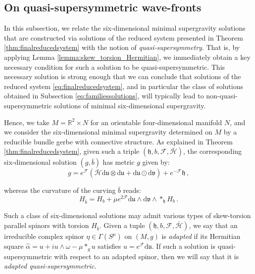 \documentclass[10pt,a4paper,twoside,reqno]{amsart}
\theoremstyle{plain}
\theoremstyle{definition}
\theoremstyle{remark}
\def\dd{\mathrm{d}}
\def\cH{\mathcal{H}}
\def\cF{\mathcal{F}}
\def\cH{\mathcal{H}}
\def\dd{\mathrm{d}}
\def\fru{\mathfrak{u}}
\def\frv{\mathfrak{v}}
\begin{document}
\subsection{On quasi-supersymmetric wave-fronts}


In this subsection, we relate the six-dimensional minimal supergravity solutions that are constructed via solutions of the reduced system presented in Theorem \ref{thm:finalreducedsystem} with the notion of \emph{quasi-supersymmetry}. That is, by applying Lemma \ref{lemma:skew_torsion_Hermitian}, we immediately obtain a key necessary condition for such a solution to be quasi-supersymmetric. This necessary solution is strong enough that we can conclude that solutions of the reduced system \eqref{eq:finalreducedsystem}, and in particular the class of solutions obtained in Subsection \ref{eq:familiessolutions}, will typically lead to non-quasi-supersymmetric solutions of minimal six-dimensional supergravity.\medskip

Hence, we take $M=\mathbb{R}^2 \times N$ for an orientable four-dimensional manifold $N$, and we consider the six-dimensional minimal supergravity determined on $M$ by a reducible bundle gerbe with connective structure. As explained in Theorem \ref{thm:finalreducedsystem}, given such a triple $(\mathfrak{h},b,\cF,\bar{\cH})$, the corresponding six-dimensional solution $(g,\bar{b})$ has metric $g$ given by:
\begin{equation*}
g = e^{\cF} (\bar{\cH} \dd\fru \otimes \dd \fru + \dd\fru\odot \dd\frv) + e^{-\cF}\mathfrak{h}\, ,
\end{equation*}

\noindent
whereas the curvature of the curving $\bar{b}$ reads:
\begin{equation}
\label{eq:reducedH}
H_{\bar{b}} =  H_b + \mu e^{2\cF} \dd\fru \wedge \dd \frv  \wedge \ast_{\mathfrak{h}} H_b\, .
\end{equation}

\noindent
Such a class of six-dimensional solutions may admit various types of skew-torsion parallel spinors with torsion $H_{\bar{b}}$. Given a tuple $(\mathfrak{h},b,\cF,\bar{\cH})$, we say that an irreducible complex spinor $\eta\in \Gamma(S^{\mu})$ on $(M,g)$ is \emph{adapted} if its Hermitian square $\widehat{\alpha}=u+iu\wedge\omega-\mu*_{g}u$ satisfies $u = e^{\cF} \dd\fru$. If such a solution is quasi-supersymmetric with respect to an adapted spinor, then we will say that it is \emph{adapted quasi-supersymmetric}.
\end{document}
